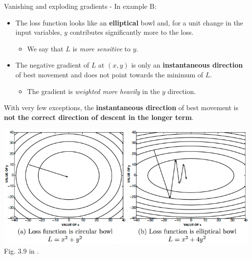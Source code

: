 \begin{frame}[t,allowframebreaks]{
    Vanishing and exploding gradients -}
    In example B:\\
    \begin{itemize}
        \small
        \item The \gls{loss function} looks like an {\bf elliptical} bowl
        and, for a unit change in the input variables,
        $y$ contributes significantly more to the loss.
        \begin{itemize}
            \small
            \item We say that $L$ is {\em more sensitive} to $y$.
        \end{itemize}    
        \item The negative \gls{gradient} of $L$ at $(x,y)$ is only
        an {\bf instantaneous direction} of best movement and does not point
        towards the minimum of $L$.
        \begin{itemize}
            \small
            \item The \gls{gradient} is {\em weighted 
            more heavily} in the $y$ direction.
        \end{itemize}    
    \end{itemize}

    \framebreak


    With very few exceptions, the {\bf instantaneous direction} 
    of best movement is {\bf not the correct direction of 
    descent in the longer term}.\\

    \vspace{0.2cm}

    \begin{center}
        \includegraphics[width=0.99\textwidth]
            {./images/training_issues/aggarwal18_shape_loss_function_grad_descent.png}\\
        {\tiny 
            \color{col:attribution} 
            Fig. 3.9 in \cite{Aggarwal:2018SpringerDL}.\\
        }
    \end{center}        


\end{frame}
